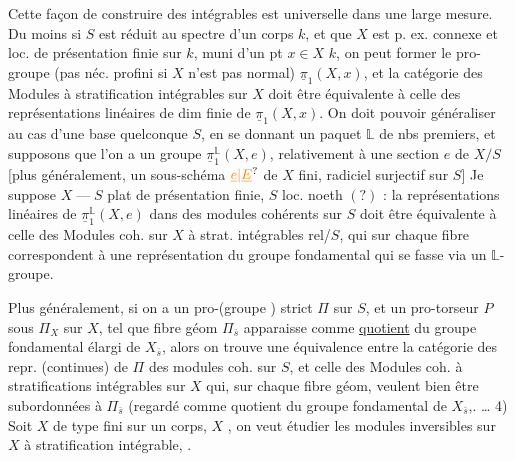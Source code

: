 Cette façon de construire des   intégrables est  universelle dans une large mesure.   Du moins si $S$ est réduit au spectre d'un corps $k$, et que $X$ est p. ex. connexe et  loc. de présentation finie sur $k$, muni d'un pt $x\in X$   $k$, on peut former le pro-groupe   (pas néc. profini si $X$ n'est pas normal) $\underline{\pi}_1(X,x)$, et la catégorie des Modules  à stratification intégrables sur $X$ doit être équivalente à celle des représentations linéaires de dim finie de $\underline{\pi}_1(X,x)$. On doit pouvoir généraliser au cas d'une base quelconque $S$, en se
donnant un paquet $\mathbb L$ de nbs premiers, et supposons que l'on a un groupe  $\underline{\pi}_1^{\mathbb L}(X,e)$, relativement à une section $e$ de $X/S$ [plus généralement, un sous-schéma $\unsure{\underline e|\underline E}$ de $X$ fini,  radiciel surjectif sur $S$] Je suppose $X\mathrel{\text{---}}S$ plat de présentation finie,  $S$ loc. noeth $(?)$ : la  représentations linéaires de $\underline{\pi}_1^{\mathbb L}(X,e)$ dans des modules cohérents sur $S$ doit être équivalente à celle des  Modules coh. sur $X$ à strat. intégrables rel/$S$, qui sur chaque fibre  correspondent à une représentation du groupe fondamental qui  se fasse via un $\mathbb L$-groupe.

Plus généralement, si on a un  pro-(groupe  )  strict $\Pi$ sur $S$, et un pro-torseur $P$ sous $\Pi_X$ sur $X$, tel que  fibre géom  $\Pi_{\bar s}$ apparaisse comme \uline{quotient} du groupe fondamental élargi de $X_{\bar s}$, alors on  trouve une  équivalence entre la catégorie des repr. (continues) de $\Pi$  des modules coh. sur $S$, et celle des Modules coh. à stratifications intégrables sur $X$ qui, sur chaque fibre géom, veulent bien être subordonnées à $\Pi_{\bar s}$ (regardé comme quotient du groupe fondamental de $X_{\bar s}$,. \ldots
4) Soit $X$ de type fini sur un corps, $X$   , on veut étudier les modules inversibles sur $X$ à stratification intégrable, . 

